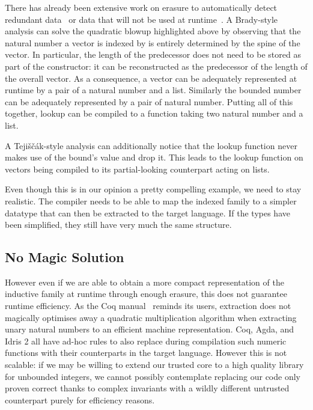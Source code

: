 \documentclass{article}
\newcommand{\idris}{Idris 2}
\newcommand{\coq}{Coq}
\newcommand{\agda}{Agda}
\begin{document}
There has already been extensive work on erasure to automatically detect redundant
data~\cite{DBLP:conf/types/BradyMM03} or data that will not be used at
runtime~\cite{DBLP:journals/pacmpl/Tejiscak20}.
%
A Brady-style analysis can solve the quadratic blowup highlighted above by observing
that the natural number a vector is indexed by is entirely determined by the spine of
the vector. In particular, the length of the predecessor does not need to be stored
as part of the constructor: it can be reconstructed as the predecessor of the length
of the overall vector. As a consequence, a vector can be adequately represented at
runtime by a pair of a natural number and a list. Similarly the bounded number can be
adequately represented by a pair of natural number. Putting all of this together,
lookup can be compiled to a function taking two natural number and a list.


A Tejiščák-style analysis can additionally notice that the lookup function never makes
use of the bound's value and drop it. This leads to the lookup function on vectors
being compiled to its partial-looking counterpart acting on lists.


Even though this is in our opinion a pretty compelling example, we need to stay
realistic. The compiler needs to be able to map the indexed family to a simpler
datatype that can then be extracted to the target language. If the types have
been simplified, they still have very much the same structure.

\subsection{No Magic Solution}


However even if we are able to obtain a more compact representation of the inductive
family at runtime through enough erasure, this does not guarantee runtime efficiency.
As the \coq{} manual~\cite{Coq:manual} reminds its users, extraction does not magically
optimises away a quadratic multiplication algorithm when extracting unary natural
numbers to an efficient machine representation.
%
\coq{}, \agda{}, and \idris{} all have ad-hoc rules to also replace during compilation
such numeric functions with their counterparts in the target language.
%
However this is not scalable: if we may be willing to extend our trusted core to a
high quality library for unbounded integers, we cannot possibly contemplate replacing
our code only proven correct thanks to complex invariants with a wildly different
untrusted counterpart purely for efficiency reasons.
\end{document}
